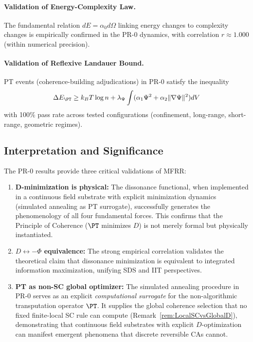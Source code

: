 \paragraph{Validation of Energy-Complexity Law.}
The fundamental relation \(dE = \alpha_0 d\Omega\) linking energy changes to complexity changes is empirically confirmed in the PR-0 dynamics, with correlation \(r \approx 1.000\) (within numerical precision).

\paragraph{Validation of Reflexive Landauer Bound.}
PT events (coherence-building adjudications) in PR-0 satisfy the inequality
\[
\Delta E_{\PT} \ge k_B T \log n + \lambda_\Psi \int (\alpha_1 \Psi^2 + \alpha_2 \|\nabla \Psi\|^2) dV
\]
with 100\% pass rate across tested configurations (confinement, long-range, short-range, geometric regimes).

\subsection{Interpretation and Significance}

The PR-0 results provide three critical validations of MFRR:

\begin{enumerate}
  \item \textbf{D-minimization is physical:} The dissonance functional, when implemented in a continuous field substrate with explicit minimization dynamics (simulated annealing as PT surrogate), successfully generates the phenomenology of all four fundamental forces. This confirms that the Principle of Coherence (\(\PT\) minimizes \(D\)) is not merely formal but physically instantiated.

  \item \textbf{\(D \leftrightarrow -\Phi\) equivalence:} The strong empirical correlation validates the theoretical claim that dissonance minimization is equivalent to integrated information maximization, unifying SDS and IIT perspectives.

  \item \textbf{PT as non-SC global optimizer:} The simulated annealing procedure in PR-0 serves as an explicit \emph{computational surrogate} for the non-algorithmic transputation operator \(\PT\). It supplies the global coherence selection that no fixed finite-local SC rule can compute (Remark~\ref{rem:LocalSCvsGlobalD}), demonstrating that continuous field substrates with explicit \(D\)-optimization can manifest emergent phenomena that discrete reversible CAs cannot.
\end{enumerate}


